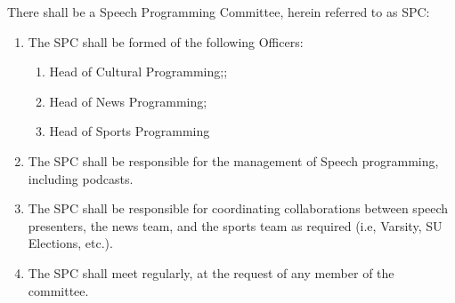 \item There shall be a Speech Programming Committee, herein referred to as SPC:
\begin{enumerate}[label*=\arabic*.]
    \item The SPC shall be formed of the following Officers:
          \begin{enumerate}[label*=\arabic*.]
              \item Head of Cultural Programming;;
              \item Head of News Programming;
              \item Head of Sports Programming
          \end{enumerate}
    \item The SPC shall be responsible for the management of Speech programming, including podcasts.
    \item The SPC shall be responsible for coordinating collaborations between speech presenters, the news team, and the sports team as required (i.e, Varsity, SU Elections, etc.).
    \item The SPC shall meet regularly, at the request of any member of the committee.
\end{enumerate}

